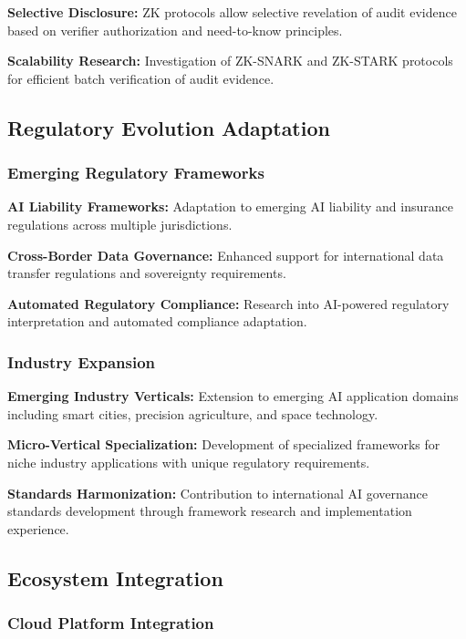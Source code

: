 \documentclass[12pt,a4paper]{article}
\begin{document}
\textbf{Selective Disclosure:} ZK protocols allow selective revelation of audit evidence based on verifier authorization and need-to-know principles.

\textbf{Scalability Research:} Investigation of ZK-SNARK and ZK-STARK protocols for efficient batch verification of audit evidence.

\subsection{Regulatory Evolution Adaptation}

\subsubsection{Emerging Regulatory Frameworks}

\textbf{AI Liability Frameworks:} Adaptation to emerging AI liability and insurance regulations across multiple jurisdictions.

\textbf{Cross-Border Data Governance:} Enhanced support for international data transfer regulations and sovereignty requirements.

\textbf{Automated Regulatory Compliance:} Research into AI-powered regulatory interpretation and automated compliance adaptation.

\subsubsection{Industry Expansion}

\textbf{Emerging Industry Verticals:} Extension to emerging AI application domains including smart cities, precision agriculture, and space technology.

\textbf{Micro-Vertical Specialization:} Development of specialized frameworks for niche industry applications with unique regulatory requirements.

\textbf{Standards Harmonization:} Contribution to international AI governance standards development through framework research and implementation experience.

\subsection{Ecosystem Integration}

\subsubsection{Cloud Platform Integration}
\end{document}
